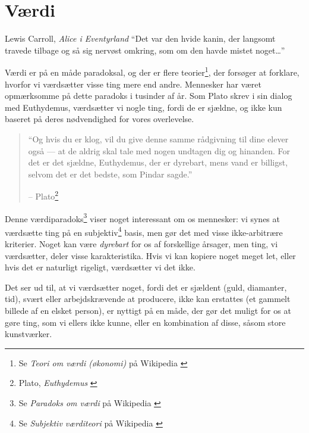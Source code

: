 \chapter{Værdi}
\label{les:10}

\begin{chapquote}{Lewis Carroll, \textit{Alice i Eventyrland}}
\enquote{Det var den hvide kanin, der langsomt travede tilbage og så sig nervøst omkring, som om den havde mistet noget\ldots}
\end{chapquote}

Værdi er på en måde paradoksal, og der er flere teorier\footnote{Se \textit{Teori om værdi (økonomi)} på Wikipedia \cite{wiki:theory-of-value}}, der forsøger at forklare, hvorfor vi værdsætter visse ting mere end andre. Mennesker har været opmærksomme på dette paradoks i tusinder af år. Som Plato skrev i sin dialog med Euthydemus, værdsætter vi nogle ting, fordi de er sjældne, og ikke kun baseret på deres nødvendighed for vores overlevelse.

\begin{quotation}\begin{samepage}
\enquote{Og hvis du er klog, vil du give denne samme rådgivning til dine elever også --- at de aldrig skal tale med nogen undtagen dig og hinanden. For det er det sjældne, Euthydemus, der er dyrebart, mens vand er billigst, selvom det er det bedste, som Pindar sagde.}
\begin{flushright} -- Plato\footnote{Plato, \textit{Euthydemus} \cite{euthydemus}}
\end{flushright}\end{samepage}\end{quotation}

Denne værdiparadoks\footnote{Se \textit{Paradoks om værdi} på Wikipedia
\cite{wiki:paradox-of-value}} viser noget interessant om os mennesker: vi synes at værdsætte ting på en subjektiv\footnote{Se \textit{Subjektiv værditeori} på Wikipedia \cite{wiki:subjective-theory-of-value}} basis, men gør det med visse ikke-arbitrære kriterier. Noget kan være \textit{dyrebart} for os af forskellige årsager, men ting, vi værdsætter, deler visse karakteristika. Hvis vi kan kopiere noget meget let, eller hvis det er naturligt rigeligt, værdsætter vi det ikke.

Det ser ud til, at vi værdsætter noget, fordi det er sjældent (guld, diamanter, tid), svært eller arbejdskrævende at producere, ikke kan erstattes (et gammelt billede af en elsket person), er nyttigt på en måde, der gør det muligt for os at gøre ting, som vi ellers ikke kunne, eller en kombination af disse, såsom store kunstværker.

